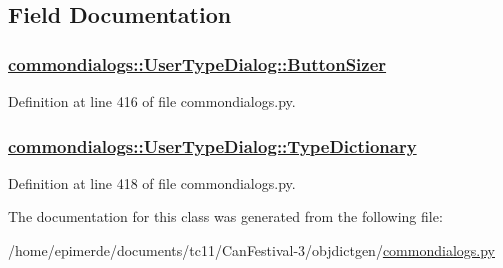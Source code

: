 \subsection{Field Documentation}
\hypertarget{classcommondialogs_1_1UserTypeDialog_7e3b701c164d3048295b9bfadcceff93}{
\subsubsection[ButtonSizer]{\setlength{\rightskip}{0pt plus 5cm}\hyperlink{classcommondialogs_1_1UserTypeDialog_7e3b701c164d3048295b9bfadcceff93}{commondialogs::User\-Type\-Dialog::Button\-Sizer}}}
\label{classcommondialogs_1_1UserTypeDialog_7e3b701c164d3048295b9bfadcceff93}




Definition at line 416 of file commondialogs.py.\hypertarget{classcommondialogs_1_1UserTypeDialog_952db9d303d08119ef6a5f275abad765}{
\subsubsection[TypeDictionary]{\setlength{\rightskip}{0pt plus 5cm}\hyperlink{classcommondialogs_1_1UserTypeDialog_952db9d303d08119ef6a5f275abad765}{commondialogs::User\-Type\-Dialog::Type\-Dictionary}}}
\label{classcommondialogs_1_1UserTypeDialog_952db9d303d08119ef6a5f275abad765}




Definition at line 418 of file commondialogs.py.

The documentation for this class was generated from the following file:\begin{CompactItemize}
\item 
/home/epimerde/documents/tc11/Can\-Festival-3/objdictgen/\hyperlink{commondialogs_8py}{commondialogs.py}\end{CompactItemize}
